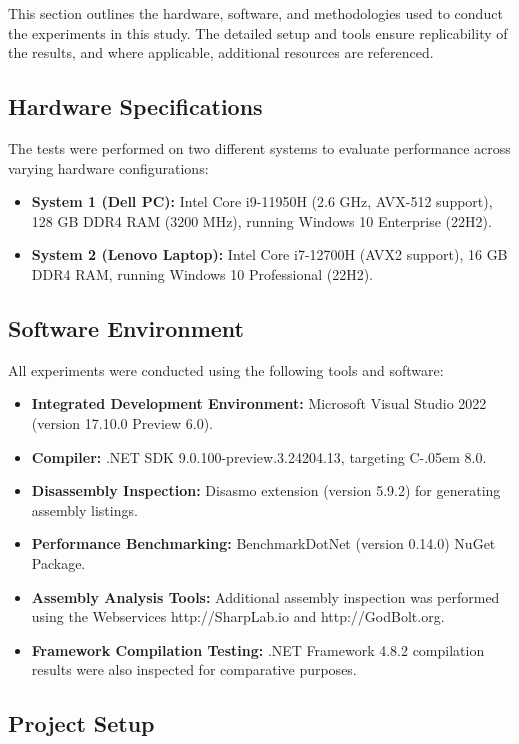 \documentclass{article}
\newcommand{\Csharp}{%
  {\settoheight{\dimen0}{C}C\kern-.05em \resizebox{!}{\dimen0}{\raisebox{\depth}{\# }}}}
\begin{document}
This section outlines the hardware, software, and methodologies used to conduct the experiments in this study. The detailed setup and tools ensure replicability of the results, and where applicable, additional resources are referenced.

\subsection{Hardware Specifications}

The tests were performed on two different systems to evaluate performance across varying hardware configurations:
\begin{itemize}
    \item \textbf{System 1 (Dell PC):} Intel Core i9-11950H (2.6 GHz, AVX-512 support), 128 GB DDR4 RAM (3200 MHz), running Windows 10 Enterprise (22H2).
    \item \textbf{System 2 (Lenovo Laptop):} Intel Core i7-12700H (AVX2 support), 16 GB DDR4 RAM, running Windows 10 Professional (22H2).
\end{itemize}

\subsection{Software Environment}

All experiments were conducted using the following tools and software:
\begin{itemize}
    \item \textbf{Integrated Development Environment:} Microsoft Visual Studio 2022 (version 17.10.0 Preview 6.0).
    \item \textbf{Compiler:} .NET SDK 9.0.100-preview.3.24204.13, targeting \Csharp 8.0.
    \item \textbf{Disassembly Inspection:} Disasmo extension (version 5.9.2) for generating assembly listings.
    \item \textbf{Performance Benchmarking:} BenchmarkDotNet (version 0.14.0) NuGet Package.
    \item \textbf{Assembly Analysis Tools:} Additional assembly inspection was performed using the Webservices http://SharpLab.io and http://GodBolt.org.
    \item \textbf{Framework Compilation Testing:} .NET Framework 4.8.2 compilation results were also inspected for comparative purposes.
\end{itemize}

\subsection{Project Setup}
\end{document}
